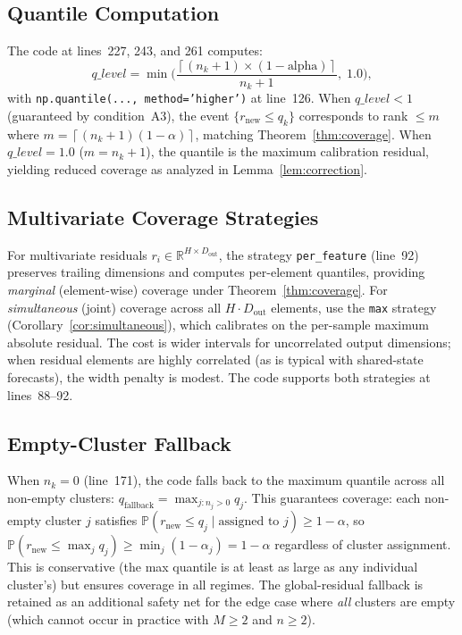 \documentclass[11pt]{article}
\newcommand{\R}{\mathbb{R}}
\newcommand{\Pbb}{\mathbb{P}}
\newcommand{\ceil}[1]{\left\lceil #1 \right\rceil}
\begin{document}
\subsection*{Quantile Computation}

The code at lines~227, 243, and 261 computes:
\[
q\_level = \min\!\Big(\frac{\ceil{(n_k + 1) \times (1 - \text{alpha})}}{n_k + 1},\; 1.0\Big),
\]
with \texttt{np.quantile(..., method='higher')} at line~126. When $q\_level < 1$ (guaranteed by condition~A3), the event $\{r_{\text{new}} \leq q_k\}$ corresponds to rank $\leq m$ where $m = \ceil{(n_k+1)(1-\alpha)}$, matching Theorem~\ref{thm:coverage}. When $q\_level = 1.0$ ($m = n_k+1$), the quantile is the maximum calibration residual, yielding reduced coverage as analyzed in Lemma~\ref{lem:correction}.

\subsection*{Multivariate Coverage Strategies}

For multivariate residuals $r_i \in \R^{H \times D_{\text{out}}}$, the strategy \texttt{per\_feature} (line~92) preserves trailing dimensions and computes per-element quantiles, providing \emph{marginal} (element-wise) coverage under Theorem~\ref{thm:coverage}. For \emph{simultaneous} (joint) coverage across all $H \cdot D_{\text{out}}$ elements, use the \texttt{max} strategy (Corollary~\ref{cor:simultaneous}), which calibrates on the per-sample maximum absolute residual. The cost is wider intervals for uncorrelated output dimensions; when residual elements are highly correlated (as is typical with shared-state forecasts), the width penalty is modest. The code supports both strategies at lines~88--92.

\subsection*{Empty-Cluster Fallback}

When $n_k = 0$ (line~171), the code falls back to the maximum quantile across all non-empty clusters: $q_{\text{fallback}} = \max_{j: n_j > 0} q_j$. This guarantees coverage: each non-empty cluster $j$ satisfies $\Pbb(r_{\text{new}} \leq q_j \mid \text{assigned to } j) \geq 1-\alpha$, so $\Pbb(r_{\text{new}} \leq \max_j q_j) \geq \min_j (1-\alpha_j) = 1-\alpha$ regardless of cluster assignment. This is conservative (the max quantile is at least as large as any individual cluster's) but ensures coverage in all regimes. The global-residual fallback is retained as an additional safety net for the edge case where \emph{all} clusters are empty (which cannot occur in practice with $M \geq 2$ and $n \geq 2$).
\end{document}
